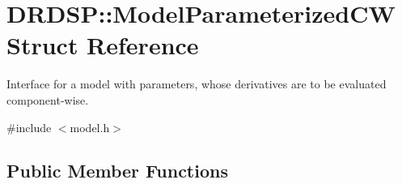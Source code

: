 \hypertarget{struct_d_r_d_s_p_1_1_model_parameterized_c_w}{\section{D\-R\-D\-S\-P\-:\-:Model\-Parameterized\-C\-W Struct Reference}
\label{struct_d_r_d_s_p_1_1_model_parameterized_c_w}
}


Interface for a model with parameters, whose derivatives are to be evaluated component-\/wise.  




{\ttfamily \#include $<$model.\-h$>$}

\subsection*{Public Member Functions}
